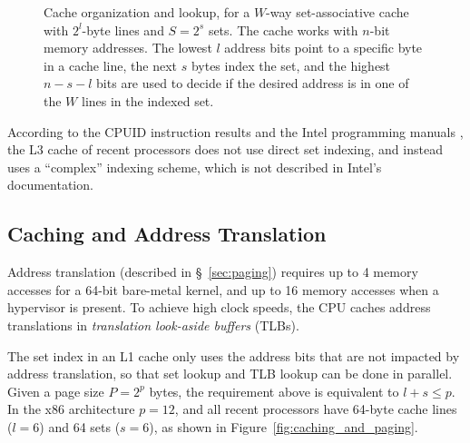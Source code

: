 \begin{figure}[hbt]
  \caption{
    Cache organization and lookup, for a $W$-way set-associative cache with
    $2^{l}$-byte lines and $S = 2^{s}$ sets. The cache works with $n$-bit
    memory addresses. The lowest $l$ address bits point to a specific byte in a
    cache line, the next $s$ bytes index the set, and the highest $n - s - l$
    bits are used to decide if the desired address is in one of the $W$ lines
    in the indexed set.
  }
  \label{fig:cpu_cache}
\end{figure}

According to the CPUID instruction results and the Intel programming manuals
\cite{intel2014manual}, the L3 cache of recent processors does not use direct
set indexing, and instead uses a ``complex'' indexing scheme, which is not
described in Intel's documentation.


\subsection{Caching and Address Translation}
\label{sec:tlbs}

Address translation (described in \S~\ref{sec:paging}) requires up to 4 memory
accesses for a 64-bit bare-metal kernel, and up to 16 memory accesses when a
hypervisor is present. To achieve high clock speeds, the CPU caches address
translations in \textit{translation look-aside buffers} (TLBs).

The set index in an L1 cache only uses the address bits that are not impacted
by address translation, so that set lookup and TLB lookup can be done in
parallel. Given a page size $P = 2^{p}$ bytes, the requirement above is
equivalent to $l + s \le p$. In the x86 architecture $p = 12$, and all recent
processors have 64-byte cache lines ($l = 6$) and 64 sets ($s = 6$), as shown
in Figure~\ref{fig:caching_and_paging}.

